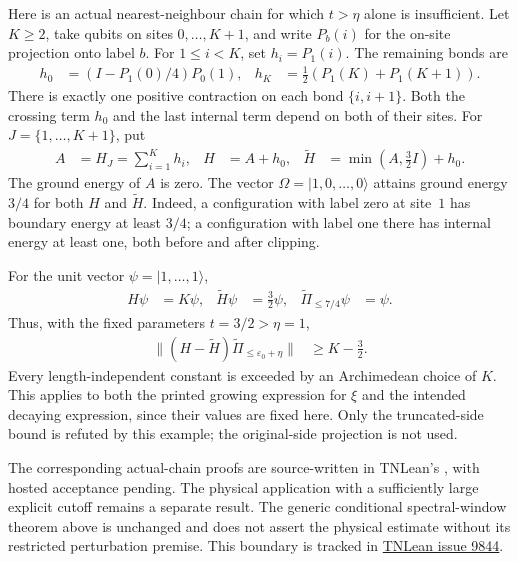 \documentclass{article}
\begin{document}
Here is an actual nearest-neighbour chain for which $t>\eta$ alone is
insufficient. Let $K\ge2$, take qubits on sites $0,\ldots,K+1$, and write
$P_b(i)$ for the on-site projection onto label $b$.
For $1\le i<K$, set $h_i=P_1(i)$. The remaining bonds are
\begin{align*}
    h_0 & =(I-P_1(0)/4)P_0(1),        &
    h_K & =\tfrac12(P_1(K)+P_1(K+1)).
\end{align*}
There is exactly one positive contraction on each bond $\{i,i+1\}$.
Both the crossing term $h_0$ and the last internal term depend on both
of their sites. For $J=\{1,\ldots,K+1\}$, put
\begin{align*}
    A            & =H_J=\sum_{i=1}^K h_i,   &
    H            & =A+h_0,                  &
    \widetilde H & =\min(A,\tfrac32 I)+h_0.
\end{align*}
The ground energy of $A$ is zero. The vector
$\Omega=|1,0,\ldots,0\rangle$ attains ground energy $3/4$ for both
$H$ and $\widetilde H$. Indeed, a configuration with label zero at
site~$1$ has boundary energy at least $3/4$; a configuration with label
one there has internal energy at least one, both before and after clipping.

For the unit vector $\psi=|1,\ldots,1\rangle$,
\begin{align*}
    H\psi                      & =K\psi,        &
    \widetilde H\psi           & =\tfrac32\psi, &
    \widetilde\Pi_{\le7/4}\psi & =\psi.
\end{align*}
Thus, with the fixed parameters $t=3/2>\eta=1$,
\begin{align*}
    \|(H-\widetilde H)\widetilde\Pi_{\le\varepsilon_0+\eta}\|
     & \ge K-\tfrac32.
\end{align*}
Every length-independent constant is exceeded by an Archimedean choice
of $K$. This applies to both the printed growing expression for $\xi$ and
the intended decaying expression, since their values are fixed here.
Only the truncated-side bound is refuted by this example; the
original-side projection is not used.

The corresponding actual-chain proofs are source-written in TNLean's
, with hosted acceptance
pending. The physical application with a sufficiently large explicit cutoff
remains a separate result. The generic conditional spectral-window theorem
above is unchanged and does not assert the physical estimate without its
restricted perturbation premise. This boundary is tracked in
\href{https://github.com/LionSR/TNLean/issues/9844}{TNLean issue 9844}.
\end{document}
